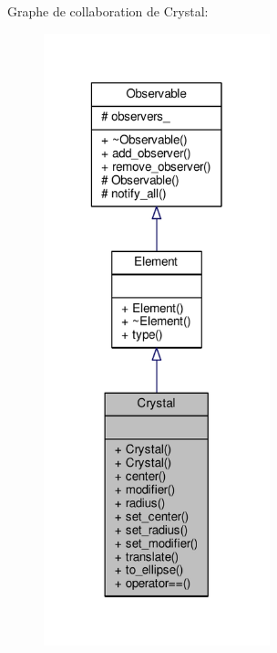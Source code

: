 Graphe de collaboration de Crystal\+:
\nopagebreak
\begin{figure}[H]
\begin{center}
\leavevmode
\includegraphics[width=186pt]{d4/db0/classCrystal__coll__graph}
\end{center}
\end{figure}
